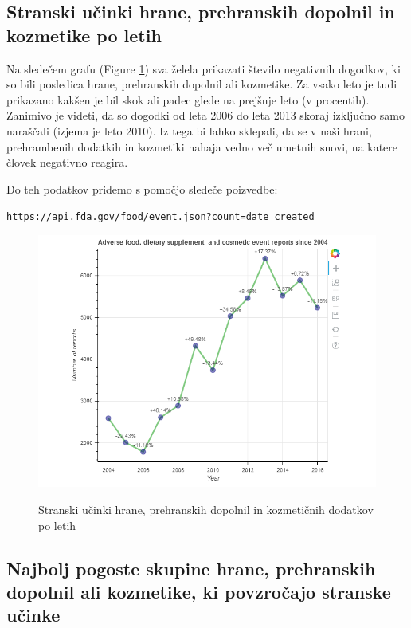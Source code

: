 \documentclass[a4paper,10pt]{article}
\begin{document}
{{\subsection{Stranski učinki hrane, prehranskih dopolnil in kozmetike po letih}
Na sledečem grafu (Figure \ref{ar}) sva želela prikazati število negativnih dogodkov, ki so bili posledica hrane, prehranskih dopolnil ali kozmetike. Za vsako leto je tudi prikazano kakšen je bil skok ali padec glede na prejšnje leto (v procentih). Zanimivo je videti, da so dogodki od leta 2006 do leta 2013 skoraj izključno samo naraščali (izjema je leto 2010). Iz tega bi lahko sklepali, da se v naši hrani, prehrambenih dodatkih in kozmetiki nahaja vedno več umetnih snovi, na katere človek negativno reagira.

\vspace{5mm}
Do teh podatkov pridemo s pomočjo sledeče poizvedbe:

\vspace{5mm}
\texttt{https://api.fda.gov/food/event.json?count=date\_created}
\begin{figure}[H]
  \caption{Stranski učinki hrane, prehranskih dopolnil in kozmetičnih dodatkov po letih}
  \centering
    \includegraphics[width=1\textwidth]{adverseReactions.png}
    \label{ar}
\end{figure}


\subsection{Najbolj pogoste skupine hrane, prehranskih dopolnil ali kozmetike, ki povzročajo stranske učinke}

}}
\end{document}
